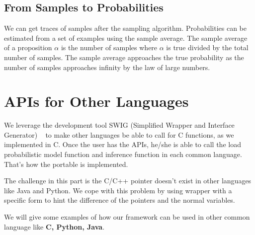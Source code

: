 \subsection{From Samples to Probabilities}
We can get traces of samples after the sampling algorithm. Probabilities can be estimated from a set of examples using the sample average. The sample average of a proposition $\alpha$ is the number of samples where $\alpha$ is true divided by the total number of samples. The sample average approaches the true probability as the number of samples approaches infinity by the law of large numbers.

\section{APIs for Other Languages}
\label{sec:api}
We leverage the development tool SWIG (Simplified Wrapper and Interface Generator) ~\cite{swig} to make other languages be able to call for C functions, as we implemented in C. Once the user has the APIs, he/she is able to call the load probabilistic model function and inference function in each common language. That's how the portable is implemented. 

	The challenge in this part is the C/C++ pointer doesn’t exist in other languages like Java and Python. We cope with this problem by using wrapper with a specific form to hint the difference of the pointers and the normal variables.
  
  We will give some examples of how our framework can be used in other common language like \textbf{C, Python, Java}.
  
